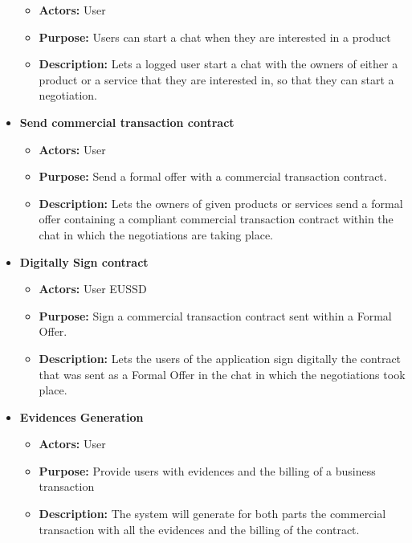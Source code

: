 \documentclass[./main.tex]{subfiles}
\begin{document}
\begin{itemize}
  \begin{itemize}
  
  \item
    \textbf{Actors:} User
  \item
    \textbf{Purpose:} Users can start a chat when they are interested in
    a product
  \item
    \textbf{Description:} Lets a logged user start a chat with the
    owners of either a product or a service that they are interested in,
    so that they can start a negotiation.
  \end{itemize}
\item
  \textbf{Send commercial transaction contract}

  \begin{itemize}
  
  \item
    \textbf{Actors:} User
  \item
    \textbf{Purpose:} Send a formal offer with a commercial transaction
    contract.
  \item
    \textbf{Description:} Lets the owners of given products or services
    send a formal offer containing a compliant commercial transaction
    contract within the chat in which the negotiations are taking place.
  \end{itemize}
\item
  \textbf{Digitally Sign contract}

  \begin{itemize}
  
  \item
    \textbf{Actors:} User EUSSD
  \item
    \textbf{Purpose:} Sign a commercial transaction contract sent within
    a Formal Offer.
  \item
    \textbf{Description:} Lets the users of the application sign
    digitally the contract that was sent as a Formal Offer in the chat
    in which the negotiations took place.
  \end{itemize}
\item
  \textbf{Evidences Generation}

  \begin{itemize}
  
  \item
    \textbf{Actors:} User
  \item
    \textbf{Purpose:} Provide users with evidences and the billing of a
    business transaction
  \item
    \textbf{Description:} The system will generate for both parts the
    commercial transaction with all the evidences and the billing of
    the contract.
  \end{itemize}
\end{itemize}
\end{document}

